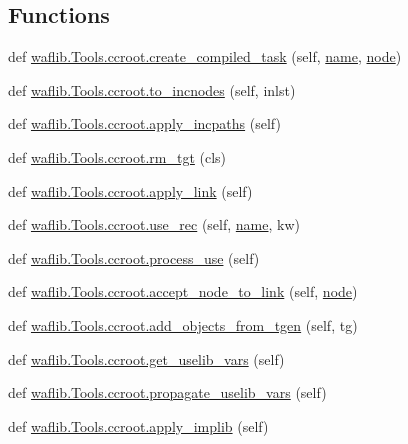 \subsection*{Functions}
\begin{DoxyCompactItemize}
\item 
def \hyperlink{namespacewaflib_1_1_tools_1_1ccroot_aa2b134d88893eeede9656625b368d4df}{waflib.\+Tools.\+ccroot.\+create\+\_\+compiled\+\_\+task} (self, \hyperlink{lib_2expat_8h_a1b49b495b59f9e73205b69ad1a2965b0}{name}, \hyperlink{structnode}{node})
\item 
def \hyperlink{namespacewaflib_1_1_tools_1_1ccroot_a9fab91da39fc8c94a2826622c25703e7}{waflib.\+Tools.\+ccroot.\+to\+\_\+incnodes} (self, inlst)
\item 
def \hyperlink{namespacewaflib_1_1_tools_1_1ccroot_a209fe95a2d6634413b5e6773ba562536}{waflib.\+Tools.\+ccroot.\+apply\+\_\+incpaths} (self)
\item 
def \hyperlink{namespacewaflib_1_1_tools_1_1ccroot_a064fb92f08a61ad149ebee72c996ff05}{waflib.\+Tools.\+ccroot.\+rm\+\_\+tgt} (cls)
\item 
def \hyperlink{namespacewaflib_1_1_tools_1_1ccroot_acac52f2a19937efc730bbd89dcdb5557}{waflib.\+Tools.\+ccroot.\+apply\+\_\+link} (self)
\item 
def \hyperlink{namespacewaflib_1_1_tools_1_1ccroot_af7254ab1c6dae3b1341666b00ff2f797}{waflib.\+Tools.\+ccroot.\+use\+\_\+rec} (self, \hyperlink{lib_2expat_8h_a1b49b495b59f9e73205b69ad1a2965b0}{name}, kw)
\item 
def \hyperlink{namespacewaflib_1_1_tools_1_1ccroot_a0dfe9860a7d42293da74e5756a5f2dbd}{waflib.\+Tools.\+ccroot.\+process\+\_\+use} (self)
\item 
def \hyperlink{namespacewaflib_1_1_tools_1_1ccroot_a799daddc37603b485a8ebc6d267f90e7}{waflib.\+Tools.\+ccroot.\+accept\+\_\+node\+\_\+to\+\_\+link} (self, \hyperlink{structnode}{node})
\item 
def \hyperlink{namespacewaflib_1_1_tools_1_1ccroot_a5096365526f9a4345de471f11f55fc8f}{waflib.\+Tools.\+ccroot.\+add\+\_\+objects\+\_\+from\+\_\+tgen} (self, tg)
\item 
def \hyperlink{namespacewaflib_1_1_tools_1_1ccroot_ae3a8e5a0dcca4c371c1e4aded647ba96}{waflib.\+Tools.\+ccroot.\+get\+\_\+uselib\+\_\+vars} (self)
\item 
def \hyperlink{namespacewaflib_1_1_tools_1_1ccroot_a20d86827e2f92cf7e0a41c3e9a44298d}{waflib.\+Tools.\+ccroot.\+propagate\+\_\+uselib\+\_\+vars} (self)
\item 
def \hyperlink{namespacewaflib_1_1_tools_1_1ccroot_ad50b323d3f7107b193b8aa67be013744}{waflib.\+Tools.\+ccroot.\+apply\+\_\+implib} (self)

\end{DoxyCompactItemize}
